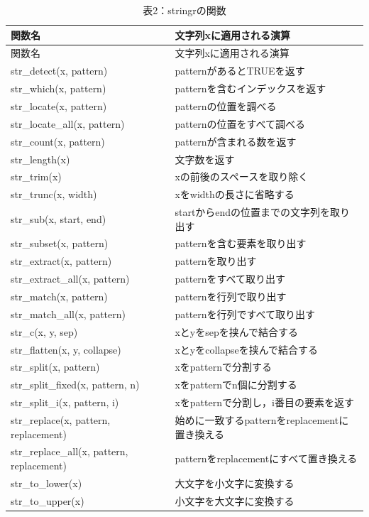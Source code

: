 \documentclass[
  letterpaper,
  DIV=11,
  numbers=noendperiod]{scrreprt}
\begin{document}
\begin{longtable}[]{@{}ll@{}}
\caption{表2：stringrの関数}\tabularnewline
\toprule()
関数名 & 文字列xに適用される演算 \\
\midrule()
\endfirsthead
\toprule()
関数名 & 文字列xに適用される演算 \\
\midrule()
\endhead
str\_detect(x, pattern) & patternがあるとTRUEを返す \\
str\_which(x, pattern) & patternを含むインデックスを返す \\
str\_locate(x, pattern) & patternの位置を調べる \\
str\_locate\_all(x, pattern) & patternの位置をすべて調べる \\
str\_count(x, pattern) & patternが含まれる数を返す \\
str\_length(x) & 文字数を返す \\
str\_trim(x) & xの前後のスペースを取り除く \\
str\_trunc(x, width) & xをwidthの長さに省略する \\
str\_sub(x, start, end) & startからendの位置までの文字列を取り出す \\
str\_subset(x, pattern) & patternを含む要素を取り出す \\
str\_extract(x, pattern) & patternを取り出す \\
str\_extract\_all(x, pattern) & patternをすべて取り出す \\
str\_match(x, pattern) & patternを行列で取り出す \\
str\_match\_all(x, pattern) & patternを行列ですべて取り出す \\
str\_c(x, y, sep) & xとyをsepを挟んで結合する \\
str\_flatten(x, y, collapse) & xとyをcollapseを挟んで結合する \\
str\_split(x, pattern) & xをpatternで分割する \\
str\_split\_fixed(x, pattern, n) & xをpatternでn個に分割する \\
str\_split\_i(x, pattern, i) & xをpatternで分割し，i番目の要素を返す \\
str\_replace(x, pattern, replacement) &
始めに一致するpatternをreplacementに置き換える \\
str\_replace\_all(x, pattern, replacement) &
patternをreplacementにすべて置き換える \\
str\_to\_lower(x) & 大文字を小文字に変換する \\
str\_to\_upper(x) & 小文字を大文字に変換する \\
\bottomrule()
\end{longtable}
\end{document}
